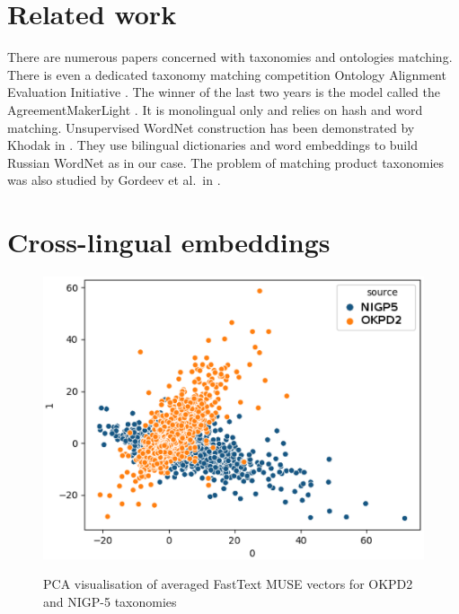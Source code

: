 \documentclass[11pt,a4paper]{article}
\begin{document}
\section{Related work}
There are numerous papers concerned with taxonomies and ontologies matching. There is even a dedicated taxonomy matching competition Ontology Alignment Evaluation Initiative \cite{ontology-sota}. The winner of the last two years is the model called the AgreementMakerLight \cite{faria}. It is monolingual only and relies on hash and word matching. Unsupervised WordNet construction has been demonstrated by Khodak in \citeyearpar{Khodak2017}. They use bilingual dictionaries and word embeddings to build Russian WordNet as in our case. The problem of matching product taxonomies was also studied by Gordeev et al.\ in \citeyearpar{gordeev-fruct}.

\section{Cross-lingual embeddings}

\begin{figure}

	\centering
	\small
	\includegraphics[scale=0.5]{tsne_new}\\

	\caption{PCA visualisation of averaged FastText MUSE vectors for OKPD2 and NIGP-5 taxonomies}
	\label{original-doc2vec}
\end{figure}
\end{document}
